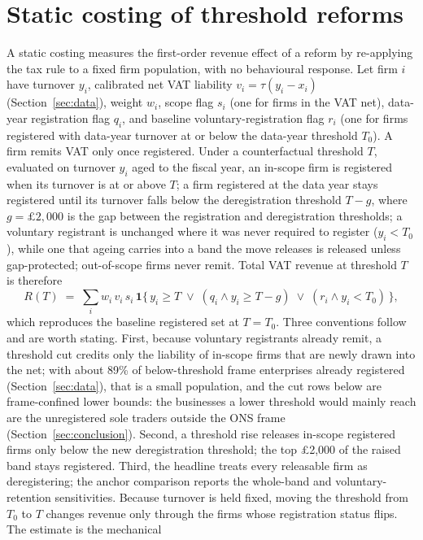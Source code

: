 \section{Static costing of threshold reforms}
\label{sec:static}

A static costing measures the first-order revenue effect of a reform by re-applying
the tax rule to a fixed firm population, with no behavioural response. Let firm $i$
have turnover $y_i$, calibrated net VAT liability $v_i = \tau(y_i - x_i)$
(Section~\ref{sec:data}), weight $w_i$, scope flag $s_i$ (one for firms in
the VAT net), data-year registration flag $q_i$, and baseline
voluntary-registration flag $r_i$ (one for firms registered with data-year
turnover at or below the data-year threshold $T_0$). A firm remits VAT only
once registered. Under a counterfactual threshold $T$, evaluated on turnover
$y_i$ aged to the fiscal year, an in-scope firm is registered when its turnover
is at or above $T$; a firm registered at the data year stays registered until
its turnover falls below the deregistration threshold $T-g$, where
$g=\pounds2{,}000$ is the gap between the registration and deregistration
thresholds; a voluntary registrant is unchanged
where it was never required to register ($y_i<T_0$), while one that ageing
carries into a band the move releases is released unless gap-protected;
out-of-scope firms never remit. Total VAT revenue at threshold $T$ is therefore
\[
  R(T) \;=\; \sum_i w_i\, v_i\, s_i \,
  \mathbf{1}\bigl\{\, y_i \ge T \;\lor\; (q_i \land y_i \ge T-g)
  \;\lor\; (r_i \land y_i < T_0) \,\bigr\},
\]
which reproduces the baseline registered set at $T=T_0$. Three conventions
follow and are worth stating. First, because voluntary registrants already remit, a
threshold cut credits only the liability of in-scope firms that are newly drawn
into the net; with about 89\% of below-threshold frame enterprises already
registered (Section~\ref{sec:data}), that is a small population, and the cut
rows below are frame-confined lower bounds: the businesses a lower threshold
would mainly reach are the unregistered sole traders outside the ONS frame
(Section~\ref{sec:conclusion}). Second, a threshold rise releases in-scope
registered firms only below the new deregistration threshold; the top
\pounds2{,}000 of the raised band stays registered. Third, the headline treats
every releasable firm as deregistering; the anchor comparison reports the
whole-band and voluntary-retention sensitivities. Because turnover is held
fixed, moving the threshold from $T_0$ to $T$ changes revenue only through the
firms whose registration status flips. The estimate is the mechanical
